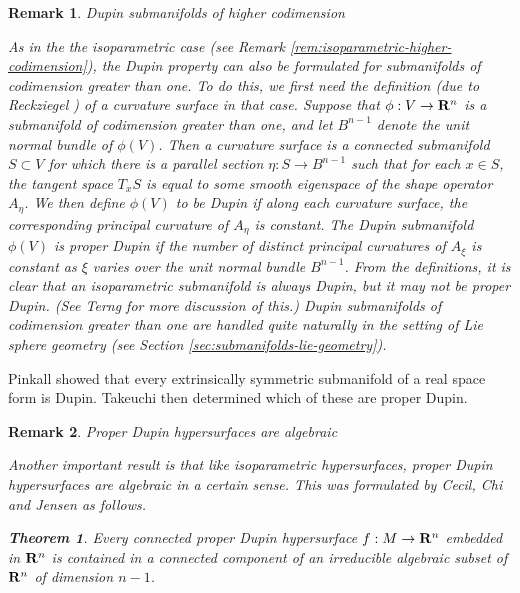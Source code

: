 \documentclass[12pt]{article}
\newtheorem{theorem}{Theorem}[section]
\newtheorem{remark}{Remark}[section]
\begin{document}
{\begin{remark}{Dupin submanifolds of higher codimension}
\label{rem:dupin-submanifolds-of-higher-codimension}

\noindent
{\rm As in the the isoparametric case (see Remark \ref{rem:isoparametric-higher-codimension}),
the Dupin property can also be formulated for submanifolds of 
codimension greater than one.  To do this, we first need the definition
(due to Reckziegel \cite{Reck})
of a curvature surface in that case.  Suppose that
$\phi:V \rightarrow {\bf R}^n$ is a submanifold of
codimension greater than one, and let $B^{n-1}$ denote the
unit normal bundle of $\phi(V)$.  Then a {\em curvature
surface} is a connected submanifold $S \subset V$ for which
there is a parallel section $\eta : S \rightarrow B^{n-1}$
such that for each $x \in S$, the tangent space $T_xS$ is
equal to some smooth eigenspace of the shape operator
$A_{\eta}$. 
We then define $\phi(V)$ to be {\em Dupin}
if along each curvature surface, the corresponding principal
curvature of $A_{\eta}$ is constant.  The Dupin
submanifold $\phi(V)$ is {\em proper Dupin} if the number
of distinct principal curvatures of $A_{\xi}$ is constant as $\xi$ varies over
the unit normal bundle $B^{n-1}$.  From the definitions,
it is clear that an isoparametric submanifold is always
Dupin, but it may not be proper Dupin.  (See Terng
\cite[pp. 464--469]{Te5} for more discussion of this.)  Dupin submanifolds
of codimension greater than one
are handled quite naturally in the setting
of Lie sphere geometry (see Section \ref{sec:submanifolds-lie-geometry}).}
\end{remark}



Pinkall \cite[p. 439]{P2} showed that every extrinsically 
symmetric submanifold of a real space form is Dupin.  Takeuchi
\cite{Tak} then determined which of these are proper Dupin. \\ 





\begin{remark}{Proper Dupin hypersurfaces are algebraic}
\label{rem:dupin-algebraic}

\noindent
{\rm Another important result is that like isoparametric hypersurfaces,
proper Dupin hypersurfaces are algebraic in a certain sense.  
This was formulated by Cecil, Chi and Jensen \cite{CCJ3} as follows.}

\begin{theorem}
\label{thm:Dupin-algebraic}
Every connected proper Dupin hypersurface 
$f:M \rightarrow{\bf R}^n$ embedded in ${\bf R}^n$ is contained in a connected component of an 
irreducible algebraic subset of ${\bf R}^n$ of dimension $n-1$. 
\end{theorem}


\end{remark}}
\end{document}
